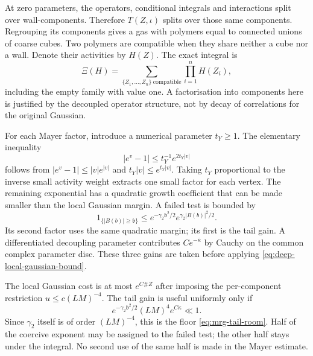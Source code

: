 \documentclass[11pt,letterpaper,reqno]{amsart}
\theoremstyle{definition}
\theoremstyle{remark}
\begin{document}
At zero parameters, the operators, conditional integrals and
interactions split over wall-components. Therefore
$T(Z,\iota)$ splits over those same components. Regrouping its
components gives a gas with polymers equal to connected unions
of coarse cubes. Two polymers are compatible when they share
neither a cube nor a wall. Denote their activities by $H(Z)$.
The exact integral is
\[
 \Xi(H)=\sum_{\{Z_1,\ldots,Z_n\}\ \mathrm{compatible}}
                                  \prod_{i=1}^nH(Z_i),
\]
including the empty family with value one. A factorisation into
components here is justified by the decoupled operator structure,
not by decay of correlations for the original Gaussian.

For each Mayer factor, introduce a numerical parameter $t_Y\ge1$.
The elementary inequality
\[
 |e^v-1|\le t_Y^{-1}e^{2t_Y|v|}
\]
follows from $|e^v-1|\le |v|e^{|v|}$ and
$t_Y|v|\le e^{t_Y|v|}$. Taking $t_Y$ proportional to the
inverse small activity weight extracts one small factor for
each vertex. The remaining exponential has a quadratic growth
coefficient that can be made smaller than the local Gaussian
margin. A failed test is bounded by
\[
 1_{\{|B(b)|\ge\mathfrak b\}}
       \le e^{-\gamma_2\mathfrak b^2/2}
                         e^{\gamma_2|B(b)|^2/2}.
\]
Its second factor uses the same quadratic margin; its first is
the tail gain. A differentiated decoupling parameter contributes
$C e^{-\bar\kappa}$ by Cauchy on the common complex parameter
disc. These three gains are taken before applying
\eqref{eq:deep-local-gaussian-bound}.

The local Gaussian cost is at most $e^{C\#Z}$ after imposing
the per-component restriction $u\le c(LM)^{-4}$.
The tail gain is useful uniformly only if
\[
 e^{-\gamma_2\mathfrak b^2/2}(LM)^4e^{C\kappa}\ll1.
\]
Since $\gamma_2$ itself is of order $(LM)^{-4}$, this is the
floor \eqref{eq:mrg-tail-room}. Half of the coercive exponent
may be assigned to the failed test; the other half stays under
the integral. No second use of the same half is made in the
Mayer estimate.
\end{document}

